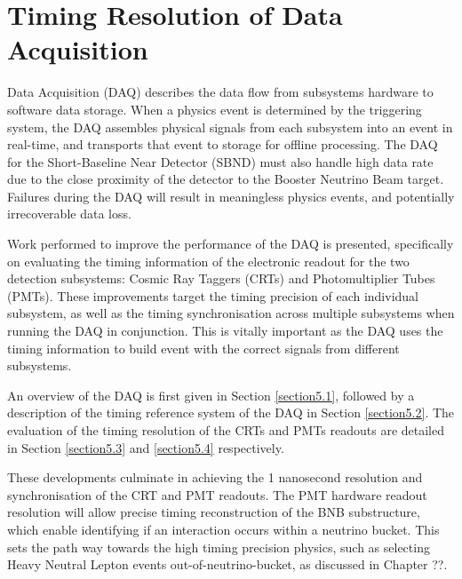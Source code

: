 \chapter{Timing Resolution of Data Acquisition}

\ifpdf
    \graphicspath{{Chapter5/Figs/Raster/}{Chapter5/Figs/PDF/}{Chapter5/Figs/}}
\else
    \graphicspath{{Chapter5/Figs/Vector/}{Chapter5/Figs/}}
\fi

Data Acquisition (DAQ) describes the data flow from subsystems hardware to software data storage. 
When a physics event is determined by the triggering system, the DAQ assembles physical signals from each subsystem into an event in real-time, and transports that event to storage for offline processing. 
The DAQ for the Short-Baseline Near Detector (SBND) must also handle high data rate due to the close proximity of the detector to the Booster Neutrino Beam target.
Failures during the DAQ will result in meaningless physics events, and potentially irrecoverable data loss. 

Work performed to improve the performance of the DAQ is presented, specifically on evaluating the timing information of the electronic readout for the two detection subsystems: Cosmic Ray Taggers (CRTs) and Photomultiplier Tubes (PMTs). 
These improvements target the timing precision of each individual subsystem, as well as the timing synchronisation across multiple subsystems when running the DAQ in conjunction. 
This is vitally important as the DAQ uses the timing information to build event with the correct signals from different subsystems.

An overview of the DAQ is first given in Section \ref{section5.1}, followed by a description of the timing reference system of the DAQ in Section \ref{section5.2}. 
The evaluation of the timing resolution of the CRTs and PMTs readouts are detailed in Section \ref{section5.3} and \ref{section5.4} respectively. 

These developments culminate in achieving the 1 nanosecond resolution and synchronisation of the CRT and PMT readouts. 
The PMT hardware readout resolution will allow precise timing reconstruction of the BNB substructure, which enable identifying if an interaction occurs within a neutrino bucket. 
This sets the path way towards the high timing precision physics, such as selecting Heavy Neutral Lepton events out-of-neutrino-bucket, as discussed in Chapter ??. 


